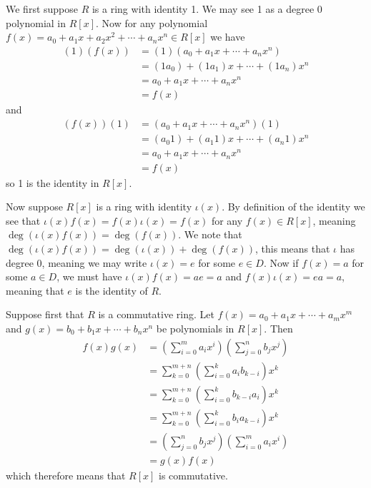 \begin{questions}
    \item \begin{partquestions}{\alph*}
        \item We first suppose $R$ is a ring with identity 1. We may see 1 as a degree 0 polynomial in $R[x]$. Now for any polynomial $f(x) = a_0+a_1x+a_2x^2+\cdots+a_nx^n \in R[x]$ we have
        \begin{align*}
            (1)(f(x)) &= (1)(a_0+a_1x+\cdots+a_nx^n)\\
            &= (1a_0)+(1a_1)x+\cdots+(1a_n)x^n\\
            &= a_0+a_1x+\cdots+a_nx^n\\
            &= f(x)
        \end{align*}
        and
        \begin{align*}
            (f(x))(1) &= (a_0+a_1x+\cdots+a_nx^n)(1)\\
            &= (a_{0}1)+(a_{1}1)x+\cdots+(a_{n}1)x^n\\
            &= a_0+a_1x+\cdots+a_nx^n\\
            &= f(x)
        \end{align*}
        so 1 is the identity in $R[x]$.

        Now suppose $R[x]$ is a ring with identity $\iota(x)$. By definition of the identity we see that $\iota(x)f(x) = f(x)\iota(x) = f(x)$ for any $f(x) \in R[x]$, meaning $\deg(\iota(x)f(x)) = \deg(f(x))$. We note that $\deg(\iota(x)f(x)) = \deg(\iota(x)) + \deg(f(x))$, this means that $\iota$ has degree 0, meaning we may write $\iota(x) = e$ for some $e \in D$. Now if $f(x) = a$ for some $a \in D$, we must have $\iota(x)f(x) = ae = a$ and $f(x)\iota(x) = ea = a$, meaning that $e$ is the identity of $R$.

        \item Suppose first that $R$ is a commutative ring. Let $f(x) = a_0 + a_1x + \cdots + a_mx^m$ and $g(x) = b_0 + b_1x + \cdots + b_nx^n$ be polynomials in $R[x]$. Then
        \begin{align*}
            f(x)g(x) &= \left(\sum_{i=0}^ma_ix^i\right)\left(\sum_{j=0}^nb_jx^j\right)\\
            &= \sum_{k=0}^{m+n}\left(\sum_{i=0}^k a_{i}b_{k-i}\right)x^k\\
            &= \sum_{k=0}^{m+n}\left(\sum_{i=0}^k b_{k-i}a_{i}\right)x^k\\
            &= \sum_{k=0}^{m+n}\left(\sum_{i=0}^k b_{i}a_{k-i}\right)x^k\\
            &= \left(\sum_{j=0}^nb_jx^j\right)\left(\sum_{i=0}^ma_ix^i\right)\\
            &= g(x)f(x)
        \end{align*}
        which therefore means that $R[x]$ is commutative.


\end{partquestions}
\end{questions}
